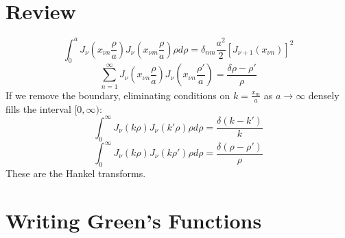 \documentclass[a4paper,twoside,master.tex]{subfiles}
\begin{document}

\section{Review}%
\label{sec:review}

\begin{equation}
    \int_0^a J_\nu\left(x_{\nu n} \frac{\rho}{a}\right) J_\nu \left(x_{\nu m}\frac{\rho}{a}\right)\rho d\rho = \delta_{nm}\frac{a^2}{2}\left[ J_{\nu+1}(x_{\nu n}) \right]^2
\end{equation}
\begin{equation}
    \sum_{n=1}^\infty J_\nu\left(x_{\nu n} \frac{\rho}{a}\right) J_\nu \left(x_{\nu n}\frac{\rho'}{a}\right) = \frac{\delta{\rho-\rho'}}{\rho}
\end{equation}
If we remove the boundary, eliminating conditions on $k = \frac{x_m}{a}$ as $a\to\infty$ densely fills the interval $[0,\infty)$:
\begin{equation}
    \int_0^\infty J_\nu\left(k\rho\right)J_\nu \left(k'\rho\right)\rho d\rho = \frac{\delta(k-k')}{k}
\end{equation}
\begin{equation}
    \int_0^\infty J_\nu\left(k\rho\right)J_\nu \left(k\rho'\right)\rho d\rho = \frac{\delta(\rho-\rho')}{\rho}
\end{equation}
These are the Hankel transforms.

\section{Writing Green's Functions}%
\label{sec:writing_gree}
\end{document}
